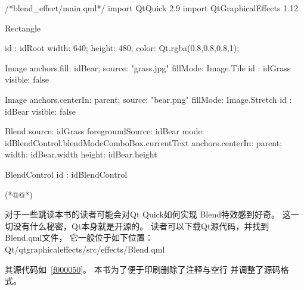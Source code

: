 \label{f000052}    %
\FloatBarrier                                  %
\begin{thebookfilesourceone}[escapeinside={(*@}{@*)},
caption=GoodLuck,
title=\filesourcenumbernameone \thefilesourcenumber
]
/*blend_effect/main.qml*/
import QtQuick 2.9
import QtGraphicalEffects 1.12

Rectangle {
    id : idRoot
    width: 640;
    height: 480;
    color: Qt.rgba(0.8,0.8,0.8,1);

    Image{
        anchors.fill: idBear;
        source: "grass.jpg"
        fillMode: Image.Tile
        id : idGrass
        visible: false
    }

    Image{
        anchors.centerIn: parent;
        source: "bear.png"
        fillMode: Image.Stretch
        id : idBear
        visible: false
    }

    Blend{
        source: idGrass
        foregroundSource: idBear
        mode: idBlendControl.blendModeComboBox.currentText
        anchors.centerIn: parent;
        width: idBear.width
        height: idBear.height
    }

    BlendControl {
        id : idBlendControl
    }

}(*@\marginpar[\hfill\setlength\fboxsep{2pt}\fbox{\footnotesize{\kaishu\parbox{1em}{\setlength{\baselineskip}{2pt}\filesourcenumbernameone}}\footnotesize{\thefilesourcenumber}}]{\setlength\fboxsep{2pt}\fbox{\footnotesize{\kaishu\parbox{1em}{\setlength{\baselineskip}{2pt}\filesourcenumbernameone}}\footnotesize{\thefilesourcenumber}}}@*)\end{thebookfilesourceone}          %
\addtocounter{lstlisting}{-1}   %


对于一些跳读本书的读者可能会对Qt Quick如何实现
Blend特效感到好奇。
这一切没有什么秘密，Qt本身就是开源的。
读者可以下载Qt源代码，并找到Blend.qml文件，
它一般位于如下位置：\\
Qt/qtgraphicaleffects/src/effects/Blend.qml

其源代码如\filesourcenumbernameone\ \ref{f000050}。
本书为了便于印刷删除了注释与空行
并调整了源码格式。

